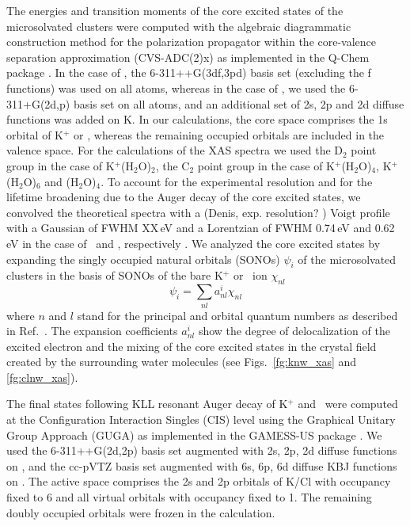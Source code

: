 The energies and transition moments of the core excited states of the microsolvated clusters were computed with the algebraic diagrammatic construction method for the polarization propagator \citep{sch82:2395} within the core-valence separation approximation \citep{bar85:867,ced80:206,ced81:1038} (CVS-ADC(2)x) as implemented in the Q-Chem package \citep{Wenzel14:1900,Wenzel14:4583,Wormit14:774,QChem2015}. In the case of \cli, the 6-311++G(3df,3pd) basis set \citep{Krishnan80:650,McLean80:5639} (excluding the f functions) was used on all atoms, whereas in the case of \ki, we used the 6-311+G(2d,p) basis set \citep{Krishnan80:650,Blaudeau97:5016} on all atoms, and an additional set of 2s, 2p and 2d diffuse functions was added on K. In our calculations, the core space comprises the 1s orbital of K$^{+}$ or \cli, whereas the remaining occupied orbitals are included in the valence space. For the calculations of the XAS spectra we used the D$_2$ point group in the case of K$^{+}$(H$_2$O)$_2$, the C$_2$ point group in the case of K$^{+}$(H$_2$O)$_4$, K$^{+}$(H$_2$O)$_6$ and \cli(H$_2$O)$_4$. To account for the experimental resolution and for the lifetime broadening due to the Auger decay of the core excited states, we convolved the theoretical spectra with a {\color{red} (Denis, exp. resolution? ) Voigt profile with a Gaussian of FWHM XX\,eV} and a Lorentzian of FWHM 0.74\,eV and 0.62\,eV in the case of \ki~and \cli, respectively \citep{Krause79:329}. We analyzed the core excited states by expanding the singly occupied natural orbitals (SONOs) $\psi_{i}$ of the microsolvated clusters in the basis of SONOs of the bare K$^{+}$ or \cli~ion $\chi_{nl}$
%
\begin{equation}\label{eq:sono_proj}
\psi_{i} = \sum_{nl} a^{i}_{nl} \chi_{nl}
\end{equation}
%
where $n$ and $l$ stand for the principal and orbital quantum numbers as described in Ref.\ \citep{miteva16:16671}. The expansion coefficients $a^{i}_{nl}$ show the degree of delocalization of the excited electron and the mixing of the core excited states in the crystal field created by the surrounding water molecules (see Figs.\ \ref{fg:knw_xas} and \ref{fg:clnw_xas}).


The final states following KLL resonant Auger decay of K$^{+}$ and \cli~were computed at the Configuration Interaction Singles (CIS) level using the Graphical Unitary Group Approach (GUGA) as implemented in the GAMESS-US package \citep{GUGA_PhysScr_21,GUGA_JCP_70,GUS}. We used the 6-311++G(2d,2p) basis set \citep{Blaudeau97:5016} augmented with 2s, 2p, 2d diffuse functions on \ki, and the cc-pVTZ basis set augmented with 6s, 6p, 6d diffuse KBJ functions \citep{Kaufmann89:2223} on \cli. The active space comprises the 2s and 2p orbitals of K/Cl with occupancy fixed to 6 and all virtual orbitals with occupancy fixed to 1. The remaining doubly occupied orbitals were frozen in the calculation. \citep{mosnier16:061401}